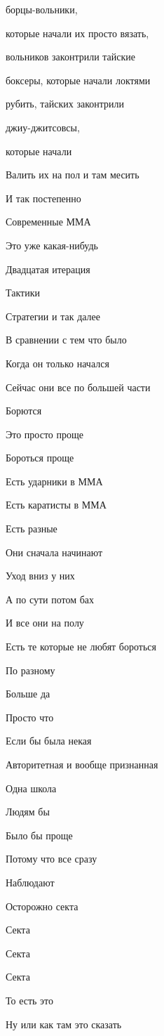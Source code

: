борцы-вольники,

которые начали их просто вязать,

вольников законтрили тайские

боксеры, которые начали локтями

рубить, тайских законтрили

джиу-джитсовсы,

которые начали

Валить их на пол и там месить

И так постепенно

Современные ММА

Это уже какая-нибудь

Двадцатая итерация

Тактики

Стратегии и так далее

В сравнении с тем что было

Когда он только начался

Сейчас они все по большей части

Борются

Это просто проще

Бороться проще

Есть ударники в ММА

Есть каратисты в ММА

Есть разные

Они сначала начинают

Уход вниз у них

А по сути потом бах

И все они на полу

Есть те которые не любят бороться

По разному

Больше да

Просто что

Если бы была некая

Авторитетная и вообще признанная

Одна школа

Людям бы

Было бы проще

Потому что все сразу

Наблюдают

Осторожно секта

Секта

Секта

Секта

То есть это

Ну или как там это сказать


